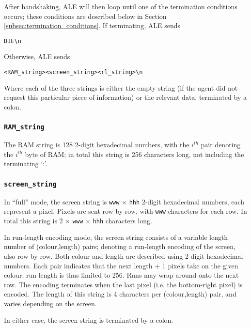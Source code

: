 \documentclass[12pt]{article}
\begin{document}
After handshaking, ALE will then loop until one of the termination conditions occurs; these conditions are described below in Section \ref{subsec:termination_conditions}. If terminating, ALE sends

\begin{verbatim}
DIE\n
\end{verbatim}

Otherwise, ALE sends

\begin{verbatim}
<RAM_string><screen_string><rl_string>\n
\end{verbatim}

Where each of the three strings is either the empty string (if the agent did not request this
particular piece of information) or the relevant data, terminated by a colon.

\subsubsection{\texttt{RAM\_string}}

The RAM string is 128 2-digit hexadecimal numbers, with the $i^{th}$ pair denoting the
$i^{th}$ byte of RAM; in total this string is 256 characters long, not including the terminating
`:'.

\subsubsection{\texttt{screen\_string}}

In ``full'' mode, the screen string is \texttt{www} $\times$ \texttt{hhh} 2-digit hexadecimal numbers, each represent a pixel. Pixels are sent row by row, with \texttt{www} characters for each row. In total this string is 2 $\times$ \texttt{www} $\times$ \texttt{hhh} characters long.

In run-length encoding mode, the screen string consists of a variable length number of (colour,length) pairs; denoting a run-length encoding of the screen, also row by row. Both colour and length are described using 2-digit hexadecimal numbers. Each pair indicates that the next length + 1 pixels take on the given colour; run length is thus limited to 256. Runs may wrap around onto the next row. The encoding terminates when the last pixel (i.e. the bottom-right pixel) is encoded. The length of this string is 4 characters per (colour,length) pair, and varies depending on the screen.

In either case, the screen string is terminated by a colon.
\end{document}
